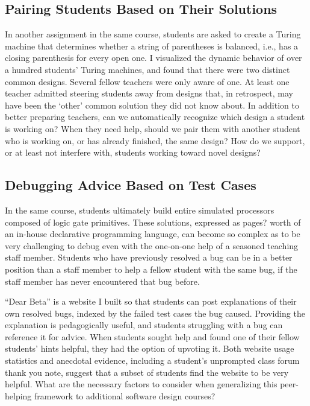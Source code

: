 \documentclass{sigchi}
\begin{document}
\subsection{Pairing Students Based on Their Solutions} In another assignment in the same course, students are asked to create a Turing machine that determines whether a string of parentheses is balanced, i.e., has a closing parenthesis for every open one. I visualized the dynamic behavior of over a hundred students' Turing machines, and found that there were two distinct common designs. Several fellow teachers were only aware of one. At least one teacher admitted steering students away from designs that, in retrospect, may have been the `other' common solution they did not know about. In addition to better preparing teachers, can we automatically recognize which design a student is working on? When they need help, should we pair them with another student who is working on, or has already finished, the same design? How do we support, or at least not interfere with, students working toward novel designs?

\subsection{Debugging Advice Based on Test Cases} In the same course, students ultimately build entire simulated processors composed of logic gate primitives. These solutions, expressed as pages? worth of an in-house declarative programming language, can become so complex as to be very challenging to debug even with the one-on-one help of a seasoned teaching staff member. Students who have previously resolved a bug can be in a better position than a staff member to help a fellow student with the same bug, if the staff member has never encountered that bug before. 

``Dear Beta'' is a website I built so that students can post explanations of their own resolved bugs, indexed by the failed test cases the bug caused. Providing the explanation is pedagogically useful, and students struggling with a bug can reference it for advice. When students sought help and found one of their fellow students' hints helpful, they had the option of upvoting it. Both website usage statistics and anecdotal evidence, including a student's unprompted class forum thank you note, suggest that a subset of students find the website to be very helpful. What are the necessary factors to consider when generalizing this peer-helping framework to additional software design courses?
\end{document}
